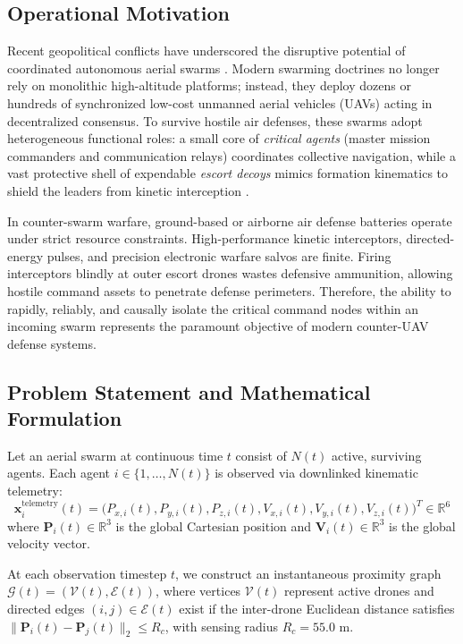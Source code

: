 \documentclass[9pt]{ieeeconf}
\newcommand{\RR}{\mathbb{R}}
\begin{document}
\subsection{Operational Motivation}
Recent geopolitical conflicts have underscored the disruptive potential of coordinated autonomous aerial swarms \cite{olfati2006flocking,reynolds1987flocks}. Modern swarming doctrines no longer rely on monolithic high-altitude platforms; instead, they deploy dozens or hundreds of synchronized low-cost unmanned aerial vehicles (UAVs) acting in decentralized consensus. To survive hostile air defenses, these swarms adopt heterogeneous functional roles: a small core of \emph{critical agents} (master mission commanders and communication relays) coordinates collective navigation, while a vast protective shell of expendable \emph{escort decoys} mimics formation kinematics to shield the leaders from kinetic interception \cite{kitsak2010identification,holme2002attack}.

In counter-swarm warfare, ground-based or airborne air defense batteries operate under strict resource constraints. High-performance kinetic interceptors, directed-energy pulses, and precision electronic warfare salvos are finite. Firing interceptors blindly at outer escort drones wastes defensive ammunition, allowing hostile command assets to penetrate defense perimeters. Therefore, the ability to rapidly, reliably, and causally isolate the critical command nodes within an incoming swarm represents the paramount objective of modern counter-UAV defense systems.

\subsection{Problem Statement and Mathematical Formulation}
Let an aerial swarm at continuous time $t$ consist of $N(t)$ active, surviving agents. Each agent $i \in \{1, \dots, N(t)\}$ is observed via downlinked kinematic telemetry:
\begin{equation}
\mathbf{x}_i^{\text{telemetry}}(t) = \big( P_{x,i}(t), P_{y,i}(t), P_{z,i}(t), V_{x,i}(t), V_{y,i}(t), V_{z,i}(t) \big)^T \in \RR^6
\end{equation}
where $\mathbf{P}_i(t) \in \RR^3$ is the global Cartesian position and $\mathbf{V}_i(t) \in \RR^3$ is the global velocity vector.

At each observation timestep $t$, we construct an instantaneous proximity graph $\mathcal{G}(t) = (\mathcal{V}(t), \mathcal{E}(t))$, where vertices $\mathcal{V}(t)$ represent active drones and directed edges $(i, j) \in \mathcal{E}(t)$ exist if the inter-drone Euclidean distance satisfies $\|\mathbf{P}_i(t) - \mathbf{P}_j(t)\|_2 \le R_c$, with sensing radius $R_c = 55.0\text{ m}$.
\end{document}
